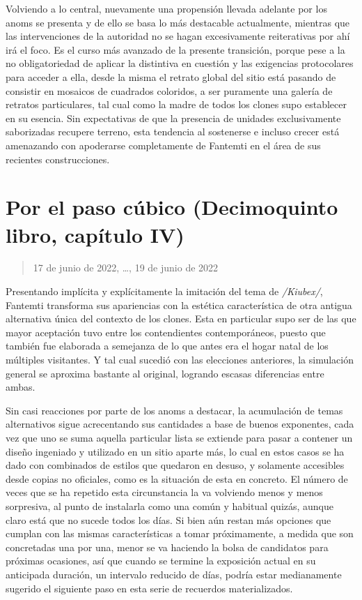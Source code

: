 \documentclass[
]{book}
\begin{document}
Volviendo a lo central, nuevamente una propensión llevada adelante por los anoms se presenta y de ello se basa lo más destacable actualmente, mientras que las intervenciones de la autoridad no se hagan excesivamente reiterativas por ahí irá el foco. Es el curso más avanzado de la presente transición, porque pese a la no obligatoriedad de aplicar la distintiva en cuestión y las exigencias protocolares para acceder a ella, desde la misma el retrato global del sitio está pasando de consistir en mosaicos de cuadrados coloridos, a ser puramente una galería de retratos particulares, tal cual como la madre de todos los clones supo establecer en su esencia. Sin expectativas de que la presencia de unidades exclusivamente saborizadas recupere terreno, esta tendencia al sostenerse e incluso crecer está amenazando con apoderarse completamente de Fantemti en el área de sus recientes construcciones.

\hypertarget{por-el-paso-cuxfabico-decimoquinto-libro-capuxedtulo-iv}{%
\section{Por el paso cúbico (Decimoquinto libro, capítulo IV)}\label{por-el-paso-cuxfabico-decimoquinto-libro-capuxedtulo-iv}}

\begin{quote}
17 de junio de 2022, \ldots, 19 de junio de 2022
\end{quote}

Presentando implícita y explícitamente la imitación del tema de \emph{/Kiubex/}, Fantemti transforma sus apariencias con la estética característica de otra antigua alternativa única del contexto de los clones. Esta en particular supo ser de las que mayor aceptación tuvo entre los contendientes contemporáneos, puesto que también fue elaborada a semejanza de lo que antes era el hogar natal de los múltiples visitantes. Y tal cual sucedió con las elecciones anteriores, la simulación general se aproxima bastante al original, logrando escasas diferencias entre ambas.

Sin casi reacciones por parte de los anoms a destacar, la acumulación de temas alternativos sigue acrecentando sus cantidades a base de buenos exponentes, cada vez que uno se suma aquella particular lista se extiende para pasar a contener un diseño ingeniado y utilizado en un sitio aparte más, lo cual en estos casos se ha dado con combinados de estilos que quedaron en desuso, y solamente accesibles desde copias no oficiales, como es la situación de esta en concreto. El número de veces que se ha repetido esta circunstancia la va volviendo menos y menos sorpresiva, al punto de instalarla como una común y habitual quizás, aunque claro está que no sucede todos los días. Si bien aún restan más opciones que cumplan con las mismas características a tomar próximamente, a medida que son concretadas una por una, menor se va haciendo la bolsa de candidatos para próximas ocasiones, así que cuando se termine la exposición actual en su anticipada duración, un intervalo reducido de días, podría estar medianamente sugerido el siguiente paso en esta serie de recuerdos materializados.
\end{document}

